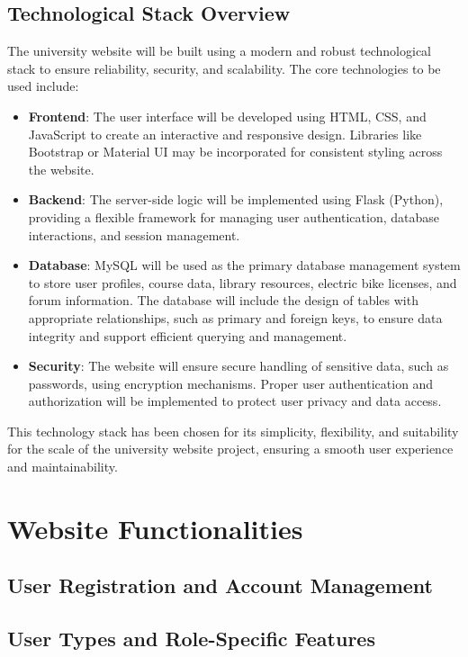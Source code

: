 \documentclass[12pt]{article}
\begin{document}
\subsection{Technological Stack Overview}
The university website will be built using a modern and robust technological stack to ensure reliability, security, and scalability.
The core technologies to be used include:
\begin{itemize}
    \item \textbf{Frontend}: The user interface will be developed using HTML, CSS, and JavaScript to create an interactive and
     responsive design. Libraries like Bootstrap or Material UI may be incorporated for consistent styling across the website.
    \item \textbf{Backend}: The server-side logic will be implemented using Flask (Python), providing a flexible framework for
    managing user authentication, database interactions, and session management.
    \item \textbf{Database}: MySQL will be used as the primary database management system to store user profiles,
    course data, library resources, electric bike licenses, and forum information. The database will include the design of
    tables with appropriate relationships, such as primary and foreign keys, to ensure data integrity and support efficient
    querying and management.
    \item \textbf{Security}: The website will ensure secure handling of sensitive data, such as passwords, using encryption
    mechanisms. Proper user authentication and authorization will be implemented to protect user privacy and data access.
\end{itemize}
This technology stack has been chosen for its simplicity, flexibility, and suitability for the scale of the university website project,
ensuring a smooth user experience and maintainability.

\newpage
\section{Website Functionalities}
\subsection{User Registration and Account Management}
\subsection{User Types and Role-Specific Features}
\end{document}
